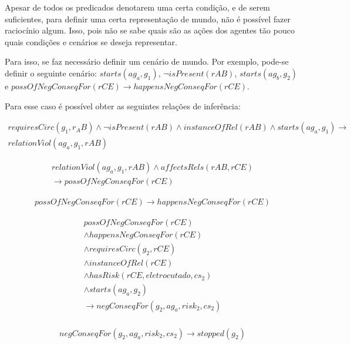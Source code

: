 Apesar de todos os predicados denotarem uma certa condição, e de serem suficientes, para definir uma certa representação de mundo, não é possível fazer raciocínio algum. Isso, pois não se sabe quais são as ações dos agentes tão pouco quais condições e cenários se deseja representar.  

Para isso, se faz necessário definir um cenário de mundo. Por exemplo, pode-se definir o seguinte cenário: $starts(ag_a,g_1)$, $\neg isPresent(rAB)$, $starts(ag_b,g_2)$ e $ possOfNegConseqFor(rCE) \to happensNegConseqFor(rCE)$. 

Para esse caso é possível obter as seguintes relações de inferência: 

\begin{eqnarray}
    requiresCirc(g_1,r_AB)\wedge 
    \neg isPresent(rAB) \wedge 
    instanceOfRel(rAB) \wedge 
    starts(ag_a,g_1) \to \nonumber \\
    relationViol(ag_a,g_1,rAB) 
\end{eqnarray}

\begin{eqnarray}
    relationViol(ag_a,g_1,rAB)  \wedge 
    affectsRels(rAB,rCE) \nonumber \\
    \to possOfNegConseqFor(rCE)  
\end{eqnarray}

\begin{eqnarray}
    possOfNegConseqFor(rCE) \to happensNegConseqFor(rCE) 
\end{eqnarray}

\begin{eqnarray}\label{paybutiamnotguilty}
   possOfNegConseqFor(rCE) \nonumber \\
   \wedge happensNegConseqFor(rCE) \nonumber \\ 
   \wedge requiresCirc(g_2,rCE) \nonumber \\  
   \wedge instanceOfRel(rCE) \nonumber \\ 
   \wedge hasRisk(rCE,eletrocutado,cs_2) \nonumber \\  
   \wedge starts(ag_a,g_2) \nonumber \\ 
   \to negConseqFor(g_2,ag_a,risk_2,cs_2) \\ \nonumber
\end{eqnarray}


\begin{eqnarray}\label{badcons}
    negConseqFor(g_2,ag_a,risk_2,cs_2) \to stopped(g_2) 
\end{eqnarray}


